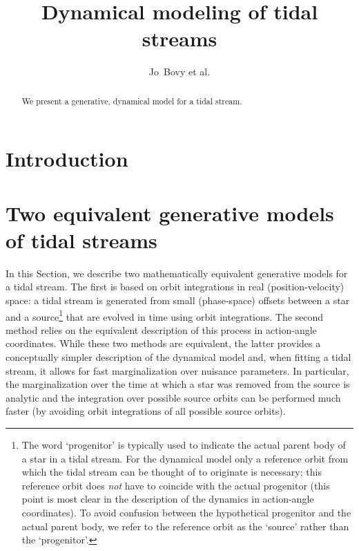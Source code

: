 \documentclass[12pt,preprint]{aastex}
\newcounter{address}
\newcommand{\etal}{et al.}
\begin{document}
\title{Dynamical modeling of tidal streams}
\author{Jo~Bovy \etal}

\begin{abstract} 
  We present a generative, dynamical model for a tidal stream.
\end{abstract}



\section{Introduction}




\section{Two equivalent generative models of tidal streams}\label{sec:method}

In this Section, we describe two mathematically equivalent generative
models for a tidal stream. The first is based on orbit integrations in
real (position-velocity) space: a tidal stream is generated from small
(phase-space) offsets between a star and a source\footnote{The word
  `progenitor' is typically used to indicate the actual parent body of
  a star in a tidal stream. For the dynamical model only a reference
  orbit from which the tidal stream can be thought of to originate is
  necessary; this reference orbit does \emph{not} have to coincide
  with the actual progenitor (this point is most clear in the
  description of the dynamics in action-angle coordinates). To avoid
  confusion between the hypothetical progenitor and the actual parent
  body, we refer to the reference orbit as the `source' rather than
  the `progenitor'.} that are evolved in time using orbit
integrations. The second method relies on the equivalent description
of this process in action-angle coordinates. While these two methods
are equivalent, the latter provides a conceptually simpler description
of the dynamical model and, when fitting a tidal stream, it allows for
fast marginalization over nuisance parameters. In particular, the
marginalization over the time at which a star was removed from the
source is analytic and the integration over possible source orbits can
be performed much faster (by avoiding orbit integrations of all
possible source orbits).
\end{document}
